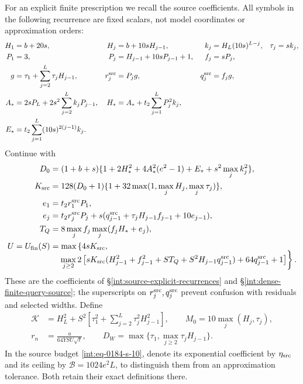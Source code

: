 For an explicit finite prescription we recall the source coefficients.
All symbols in the following recurrence are fixed scalars, not model
coordinates or approximation orders:
\begin{align*}
 H_1&=b+20s,&H_j&=b+10sH_{j-1},&
 k_j&=H_L(10s)^{L-j},&\tau_j&=sk_j,\\
 P_1&=3,&P_j&=H_{j-1}+10sP_{j-1}+1,&f_j&=sP_j,\\
 g&=\tau_1+\sum_{j=2}^L\tau_jH_{j-1},&
 r_j^{\rm src}&=P_jg,&q_j^{\rm src}&=f_jg,\\
 A_*&=2sP_L+2s^2\sum_{j=2}^Lk_jP_{j-1},&
 H_*&=A_*+t_2\sum_{j=1}^LP_j^2k_j,\\
 E_*&=t_2\sum_{j=1}^L(10s)^{2(j-1)}k_j.
\end{align*}
Continue with
\begin{align*}
 D_0&=(1+b+s)\{1+2H_*^2+4A_*^2(e^2-1)+E_*+s^2\max_jk_j^2\},\\
 K_{\rm src}&=128(D_0+1)\{1+32\max(1,\max_jH_j,\max_j\tau_j)\},\\
 e_1&=t_2r_1^{\rm src}P_1,\\
 e_j&=t_2r_j^{\rm src}P_j+
 s(q_{j-1}^{\rm src}+\tau_jH_{j-1}f_{j-1}+10e_{j-1}),\\
 T_Q&=8\max_jf_j\max_j(f_jH_*+e_j),\\
 U=U_{\rm fin}(S)&=\max\left\{4sK_{\rm src},\right.\\[-2mm]
 &\quad\left.\max_{j\ge2}2\left[sK_{\rm src}
 (H_{j-1}^2+f_{j-1}^2+ST_Q+S^2H_{j-1}q_{j-1}^{\rm src})
 +64q_{j-1}^{\rm src}+1\right]\right\}.
\end{align*}
These are the coefficients of \S\ref{int:source-explicit-recurrences}
and \S\ref{int:dense-finite-query-source}; the superscripts on
\(r_j^{\rm src},q_j^{\rm src}\) prevent confusion with residuals and
selected widths.  Define
\begin{equation}
 \begin{split}
 \mathcal K&=H_L^2+S^2\left[\tau_1^2+
                  \sum_{j=2}^L\tau_j^2H_{j-1}^2\right],\qquad
 M_0=10\max_j(H_j,\tau_j),\\
 r_n&=\frac{a}{64YSU\sqrt\ell},\qquad
 D_W=\max\{\tau_1,\max_{j\ge2}\tau_jH_{j-1}\}.
 \end{split}
 \label{eq:panel-source-coefficients}
\end{equation}
In the source budget \eqref{int:eq-0184-s-10}, denote its exponential
coefficient by \(\eta_{\rm src}\) and its ceiling by
\(\mathcal B=1024e^2L\), to distinguish them from an approximation
tolerance.  Both retain their exact definitions there.

